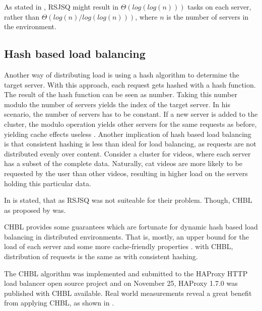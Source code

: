 As stated in \cite{powerOfTwoRandomChoices}, \ac{RSJSQ} might result in
$\Theta(log(log(n)))$ tasks on each server, rather than
$\Theta(log(n) / log(log(n)))$, where $n$ is the number of servers in the
environment.

\subsection{Hash based load balancing}

Another way of distributing load is using a hash algorithm to determine the
target server.
With this approach, each request gets hashed with a hash function.
The result of the hash function can be seen as number.
Taking this number modulo the number of servers yields the index of the target
server.
In his scenario, the number of servers has to be constant.
If a new server is added to the cluster, the modulo operation yields other
servers for the same requests as before, yielding cache effects useless
\cite{medVimeoEngin}.
Another implication of hash based load balancing is that consistent hashing is
less than ideal for load balancing, as requests are not distributed evenly over
content.
Consider a cluster for videos, where each server has a subset of the complete
data.
Naturally, cat videos are more likely to be requested by the user than other
videos, resulting in higher load on the servers holding this particular data.

In \cite{medVimeoEngin} is stated, that as \ac{RSJSQ} was not suiteable for
their problem.
Though, \ac{CHBL} as proposed by \cite{ConsistentHashingWithBoundedLoads} was.

\ac{CHBL} provides some guarantees which are fortunate for dynamic hash based
load balancing in distributed environments.
That is, mostly, an upper bound for the load of each server
\cite{ConsistentHashingWithBoundedLoads}
and some more cache-friendly properties \cite{medVimeoEngin}.
with \ac{CHBL}, distribution of requests is the same as with consistent hashing.

The \ac{CHBL} algorithm was implemented and submitted to the HAProxy HTTP load
balancer open source project and on November 25, HAProxy 1.7.0 was published
with \ac{CHBL} available.
Real world measurements reveal a great benefit from applying \ac{CHBL}, as shown
in \cite{medVimeoEngin}.

